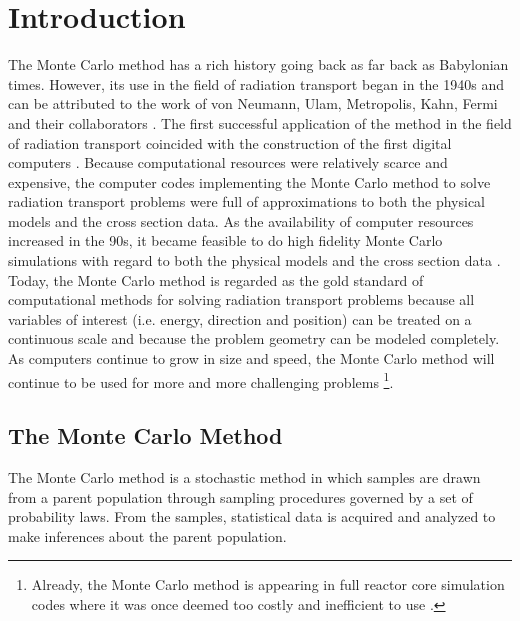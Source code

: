 \chapter{Introduction}
\label{ch:introduction}
The Monte Carlo method has a rich history going back as far back as Babylonian 
times. However, its use in the field of radiation transport began in the 1940s 
and can be attributed to the work of von Neumann, Ulam, Metropolis, Kahn, Fermi 
and their collaborators \citep{halton_retrospective_1970}. The first successful 
application of the method in the field of radiation transport coincided with 
the construction of the first digital computers \citep{lux_monte_1991}. Because 
computational resources were relatively scarce and expensive, the computer codes
implementing the Monte Carlo method to solve radiation transport problems were
full of approximations to both the physical models and the cross section data.
As the availability of computer resources increased in the 90s, it became 
feasible to do high fidelity Monte Carlo simulations with regard to both the 
physical models and the cross section data \citep{chucas_preparing_1994}. Today,
the Monte Carlo method is regarded as the gold standard of computational 
methods for solving radiation transport problems because all variables of 
interest (i.e. energy, direction and position) can be treated on a continuous
scale and because the problem geometry can be modeled completely. As 
computers continue to grow in size and speed, the Monte Carlo method will 
continue to be used for more and more challenging problems \footnote{Already, 
the Monte Carlo method is appearing in full reactor core simulation codes 
where it was once deemed too costly and inefficient to use 
\citep{hoogenboom_monte_2011}.}.

\section{The Monte Carlo Method}
\label{sec:monte_carlo_method}
The Monte Carlo method is a stochastic method in which samples are drawn from 
a parent population through sampling procedures governed by a set of 
probability laws. From the samples, statistical data is acquired and analyzed 
to make inferences about the parent population. 

